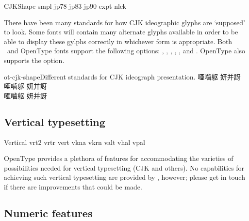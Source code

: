 \documentclass[a4paper]{l3doc}
\begin{document}
\begin{features}{CJKShape}
 {smpl}
    {jp78}
    {jp83}
    {jp90}
     {expt}
        {nlck}
\end{features}

There have been many standards for how CJK ideographic
glyphs are `supposed' to look. Some fonts will contain many alternate
glyphs available in order to be able to display these gylphs
correctly in whichever form is appropriate. Both \AAT\ and OpenType
fonts support the following  options:
, , , ,
, and . OpenType also supports the  option.

\begin{Xexample}[firstline=2]{ot-cjk-shape}{Different standards for CJK ideograph presentation.}
  \LARGE\def\text{ 唖噛躯 妍并訝}
  {
  \text }                          \\
  {
  \text }                          \\
  {
  \text }
\end{Xexample}


\subsection{Vertical typesetting}

\begin{features}{Vertical}
         {vrt2}
 {vrtr}
            {vert}
        {vkna}
               {vkrn}
      {valt}
           {vhal}
   {vpal}
\end{features}

OpenType provides a plethora of features for accommodating the varieties of possibilities
needed for vertical typesetting (CJK and others).
No capabilities for achieving such vertical typesetting are provided by ,
however; please get in touch if there are improvements that could be made.


\subsection{Numeric features}
\end{document}
